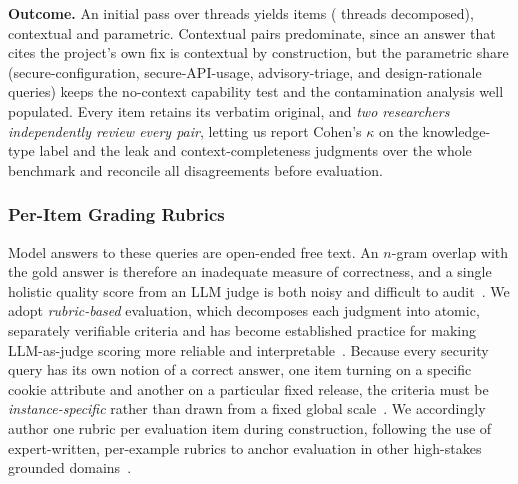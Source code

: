 
\noindent\textbf{Outcome.}
An initial pass over  threads yields  items ( threads
decomposed),  contextual and  parametric. Contextual pairs
predominate, since an answer that cites the project's own fix is contextual by
construction, but the  parametric share (secure-configuration,
secure-API-usage, advisory-triage, and design-rationale queries) keeps the
no-context capability test and the contamination analysis
well populated. Every item
retains its verbatim original, and \emph{two researchers independently review
every pair}, letting us report Cohen's $\kappa$ on the knowledge-type label and
the leak and context-completeness judgments over the whole benchmark and
reconcile all disagreements before evaluation.

\subsubsection{Per-Item Grading Rubrics}
\label{sec:rubric-prep}

Model answers to these queries are open-ended free text. An $n$-gram overlap
with the gold answer is therefore an inadequate measure of correctness, and a
single holistic quality score from an LLM judge is both noisy and difficult to
audit~\cite{zheng2023judging,liu2023geval}. We adopt \emph{rubric-based}
evaluation, which decomposes each judgment into atomic, separately verifiable
criteria and has become established practice for making LLM-as-judge scoring
more reliable and interpretable~\cite{ye2024flask,kim2024prometheus2}. Because
every security query has its own notion of a correct answer, one item turning on
a specific cookie attribute and another on a particular fixed release, the
criteria must be \emph{instance-specific} rather than drawn from a fixed global
scale~\cite{kim2025biggen}. We accordingly author one rubric per evaluation item
during construction, following the use of expert-written, per-example rubrics to
anchor evaluation in other high-stakes grounded domains~\cite{arora2025healthbench}.

